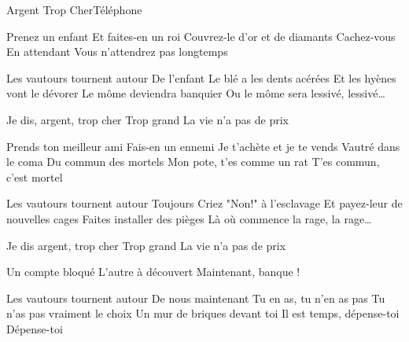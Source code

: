 \documentclass[a4paper,11pt,french]{article}
\begin{document}

\begin{Song}{Argent Trop Cher}{Téléphone}
\begin{multicols}{2}
\begin{Verse}
Prenez un enfant
Et faites-en un roi
Couvrez-le d'or et de diamants
Cachez-vous 
En attendant
Vous n'attendrez pas longtemps
\end{Verse}
\espaceInterStrophe

\begin{PreChorus}
Les vautours tournent autour
De l'enfant
Le blé a les dents acérées
Et les hyènes vont le dévorer
Le môme deviendra banquier
Ou le môme sera lessivé, lessivé\dots
\end{PreChorus}
\espaceInterStrophe

\begin{Chorus}
Je dis, argent, trop cher
Trop grand
La vie n'a pas de prix
\end{Chorus}
\espaceInterStrophe

\begin{Verse}
Prends ton meilleur ami
Fais-en un ennemi
Je t'achète et je te vends
Vautré dans le coma
Du commun des mortels
Mon pote, t'es comme un rat
T'es commun, c'est mortel
\end{Verse}
\espaceInterStrophe

\begin{PreChorus}
Les vautours tournent autour
Toujours
Criez "Non!"  à l'esclavage
Et payez-leur de nouvelles cages
Faites installer des pièges
Là où commence la rage, la rage\dots
\end{PreChorus}
\espaceInterStrophe

\begin{Chorus}
Je dis argent, trop cher
Trop grand
La vie n'a pas de prix
\end{Chorus}
\espaceInterStrophe

\begin{Verse}
Un compte bloqué
L'autre à découvert
Maintenant, banque !
\end{Verse}
\espaceInterStrophe

\begin{PreChorus}
Les vautours tournent autour
De nous maintenant
Tu en as, tu n'en as pas
Tu n'as pas vraiment le choix
Un mur de briques devant toi
Il est temps, dépense-toi
Dépense-toi
\end{PreChorus}
\espaceInterStrophe


\end{multicols}
\end{Song}
\end{document}
